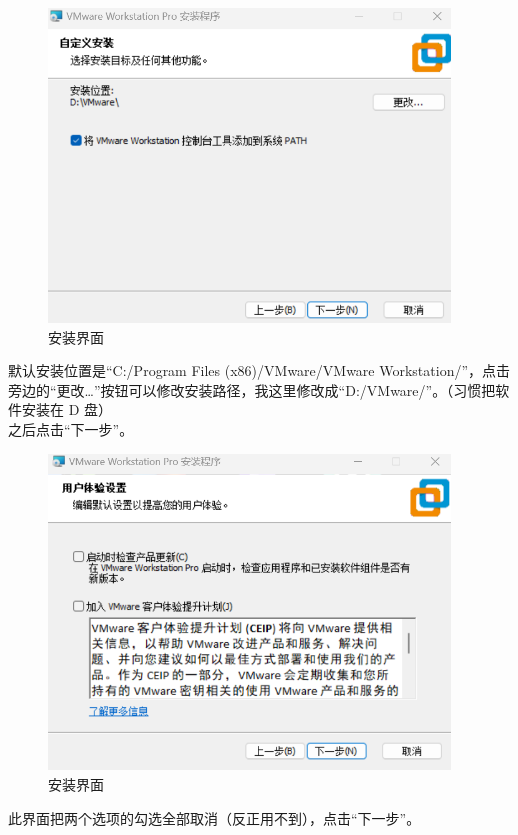 \documentclass[UTF8]{ctexart}
\begin{document}
\begin{figure}[H]
    \centering
    \includegraphics[width=0.95\textwidth]{picture/Screenshot 2024-10-14 104456.png}
    \caption{安装界面}
\end{figure}
默认安装位置是“C:/Program Files (x86)/VMware/VMware Workstation/”，点击
旁边的“更改…”按钮可以修改安装路径，我这里修改成“D:/VMware/”。（习惯把软件安装在 D 盘）
\\之后点击“下一步”。

\begin{figure}[H]
    \centering
    \includegraphics[width=0.95\textwidth]{picture/Screenshot 2024-10-14 105207.png}
    \caption{安装界面}
\end{figure}
此界面把两个选项的勾选全部取消（反正用不到），点击“下一步”。
\end{document}
